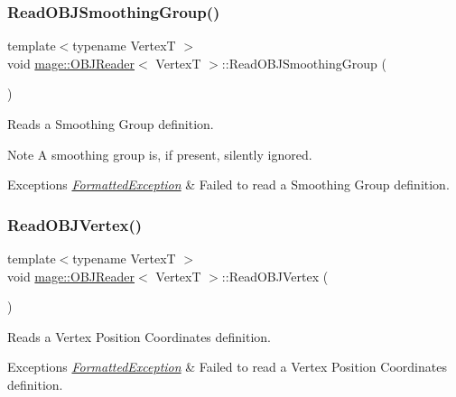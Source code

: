 \subsubsection{\texorpdfstring{Read\+O\+B\+J\+Smoothing\+Group()}{ReadOBJSmoothingGroup()}}
{\footnotesize\ttfamily template$<$typename VertexT $>$ \\
void \hyperlink{classmage_1_1_o_b_j_reader}{mage\+::\+O\+B\+J\+Reader}$<$ VertexT $>$\+::Read\+O\+B\+J\+Smoothing\+Group (\begin{DoxyParamCaption}{ }\end{DoxyParamCaption})\hspace{0.3cm}{\ttfamily [private]}}

Reads a Smoothing Group definition.

\begin{DoxyNote}{Note}
A smoothing group is, if present, silently ignored. 
\end{DoxyNote}

\begin{DoxyExceptions}{Exceptions}
{\em \hyperlink{classmage_1_1_formatted_exception}{Formatted\+Exception}} & Failed to read a Smoothing Group definition. \\
\hline
\end{DoxyExceptions}
\hypertarget{classmage_1_1_o_b_j_reader_a70fc61d8cc14dc8efbd73a88188cc511}{}\label{classmage_1_1_o_b_j_reader_a70fc61d8cc14dc8efbd73a88188cc511} 
\subsubsection{\texorpdfstring{Read\+O\+B\+J\+Vertex()}{ReadOBJVertex()}}
{\footnotesize\ttfamily template$<$typename VertexT $>$ \\
void \hyperlink{classmage_1_1_o_b_j_reader}{mage\+::\+O\+B\+J\+Reader}$<$ VertexT $>$\+::Read\+O\+B\+J\+Vertex (\begin{DoxyParamCaption}{ }\end{DoxyParamCaption})\hspace{0.3cm}{\ttfamily [private]}}

Reads a Vertex Position Coordinates definition.


\begin{DoxyExceptions}{Exceptions}
{\em \hyperlink{classmage_1_1_formatted_exception}{Formatted\+Exception}} & Failed to read a Vertex Position Coordinates definition. \\
\hline
\end{DoxyExceptions}
\hypertarget{classmage_1_1_o_b_j_reader_ace593a436953e8583b5b4cd721893c44}{}\label{classmage_1_1_o_b_j_reader_ace593a436953e8583b5b4cd721893c44} 

